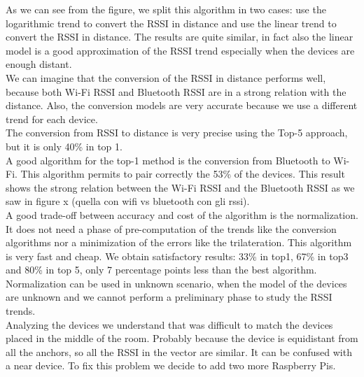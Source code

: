 As we can see from the figure, we split this algorithm in two cases: use the logarithmic trend to convert the RSSI in distance and use the linear trend to convert the RSSI in distance. The results are quite similar, in fact also the linear model is a good approximation of the RSSI trend especially when the devices are enough distant.\\
\linebreak
We can imagine that the conversion of the RSSI in distance performs well, because both Wi-Fi RSSI and Bluetooth RSSI are in a strong relation with the distance. Also, the conversion models are very accurate because we use a different trend for each device.\\
\linebreak
The conversion from RSSI to distance is very precise using the Top-5 approach, but it is only 40\% in top 1.\\
A good algorithm for the top-1 method is the conversion from Bluetooth to Wi-Fi. This algorithm permits to pair correctly the 53\% of the devices. This result shows the strong relation between the Wi-Fi RSSI and the Bluetooth RSSI as we saw in figure x (quella con wifi vs bluetooth con gli rssi).\\
\linebreak
A good trade-off between accuracy and cost of the algorithm is the normalization. It does not need a phase of pre-computation of the trends like the conversion algorithms nor a minimization of the errors like the trilateration. This algorithm is very fast and cheap. We obtain satisfactory results: 33\% in top1, 67\% in top3 and 80\% in top 5, only 7 percentage points less than the best algorithm. Normalization can be used in unknown scenario, when the model of the devices are unknown and we cannot perform a preliminary phase to study the RSSI trends.\\
\linebreak
Analyzing the devices we understand that was difficult to match the devices placed in the middle of the room. Probably because the device is equidistant from all the anchors, so all the RSSI in the vector are similar. It can be confused with a near device. To fix this problem we decide to add two more Raspberry Pis.

